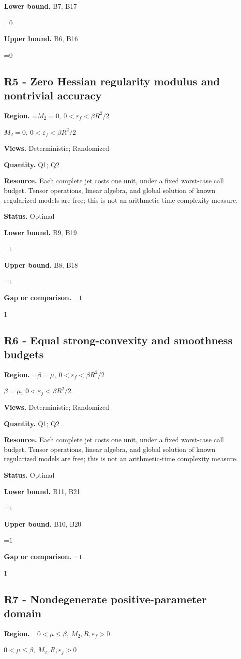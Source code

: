 \documentclass[10pt,a4paper]{article}
\newcommand{\AtlasMath}[1]{\par\begingroup\centering\setbox0=\hbox{$\displaystyle #1$}\ifdim\wd0>1.4\linewidth\typeout{ATLAS WIDE FORMULA: \the\wd0}\fi\ifdim\wd0>\linewidth\resizebox{\linewidth}{!}{\box0}\else\box0\fi\par\endgroup}
\newcommand{\AtlasInlineMath}[1]{\begingroup\setbox0=\hbox{$#1$}\ifdim\wd0>.4\linewidth\endgroup\AtlasMath{#1}\else\endgroup$#1$\fi}
\begin{document}
\textbf{Lower bound.} B7, B17

\AtlasMath{0}
\textbf{Upper bound.} B6, B16

\AtlasMath{0}
\subsection{R5 - Zero Hessian regularity modulus and nontrivial accuracy}
\textbf{Region.} \AtlasInlineMath{M_2=0,\ 0<\varepsilon_f<\beta R^2/2}

\textbf{Views.} Deterministic; Randomized

\textbf{Quantity.} Q1; Q2

\textbf{Resource.} Each complete jet costs one unit, under a fixed worst-case call budget. Tensor operations, linear algebra, and global solution of known regularized models are free; this is not an arithmetic-time complexity measure.

\textbf{Status.} Optimal

\textbf{Lower bound.} B9, B19

\AtlasMath{1}
\textbf{Upper bound.} B8, B18

\AtlasMath{1}
\textbf{Gap or comparison.} \AtlasInlineMath{1}

\subsection{R6 - Equal strong-convexity and smoothness budgets}
\textbf{Region.} \AtlasInlineMath{\beta=\mu,\ 0<\varepsilon_f<\beta R^2/2}

\textbf{Views.} Deterministic; Randomized

\textbf{Quantity.} Q1; Q2

\textbf{Resource.} Each complete jet costs one unit, under a fixed worst-case call budget. Tensor operations, linear algebra, and global solution of known regularized models are free; this is not an arithmetic-time complexity measure.

\textbf{Status.} Optimal

\textbf{Lower bound.} B11, B21

\AtlasMath{1}
\textbf{Upper bound.} B10, B20

\AtlasMath{1}
\textbf{Gap or comparison.} \AtlasInlineMath{1}

\subsection{R7 - Nondegenerate positive-parameter domain}
\textbf{Region.} \AtlasInlineMath{0<\mu\le\beta,\ M_2,R,\varepsilon_f>0}
\end{document}
